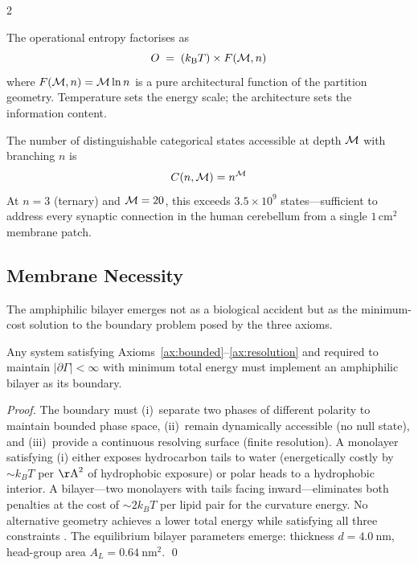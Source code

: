 \begin{multicols}{2}
\begin{corollary}
\label{cor:temperature}
The operational entropy factorises as
\begin{equation}
O \;=\; (k_{\mathrm{B}} T)\times F(\mathcal{M}, n)
\end{equation}
where $F(\mathcal{M}, n) = \mathcal{M}\ln n$ is a pure architectural function of the partition geometry. Temperature sets the energy scale; the architecture sets the information content.
\end{corollary}

\begin{corollary}
\label{cor:capacity}
The number of distinguishable categorical states accessible at depth $\mathcal{M}$ with branching $n$ is
\begin{equation}
C(n,\mathcal{M}) = n^{\mathcal{M}}
\end{equation}
At $n = 3$ (ternary) and $\mathcal{M} = 20$, this exceeds $3.5 \times 10^9$ states---sufficient to address every synaptic connection in the human cerebellum from a single $1\,\mathrm{cm}^2$ membrane patch.
\end{corollary}

\subsection{Membrane Necessity}

The amphiphilic bilayer emerges not as a biological accident but as the minimum-cost solution to the boundary problem posed by the three axioms.

\begin{theorem}
\label{thm:ch11_membrane}
Any system satisfying Axioms~\ref{ax:bounded}--\ref{ax:resolution} and required to maintain $|\partial\Gamma| < \infty$ with minimum total energy must implement an amphiphilic bilayer as its boundary.
\end{theorem}

\begin{proof}
The boundary must (i)~separate two phases of different polarity to maintain bounded phase space, (ii)~remain dynamically accessible (no null state), and (iii)~provide a continuous resolving surface (finite resolution). A monolayer satisfying (i) either exposes hydrocarbon tails to water (energetically costly by $\sim k_BT$ per $\mathrm{\AA}^2$ of hydrophobic exposure) or polar heads to a hydrophobic interior. A bilayer---two monolayers with tails facing inward---eliminates both penalties at the cost of $\sim 2k_BT$ per lipid pair for the curvature energy. No alternative geometry achieves a lower total energy while satisfying all three constraints \citep{lipowsky1995,gennis1989}. The equilibrium bilayer parameters emerge: thickness $d = 4.0\ \mathrm{nm}$, head-group area $A_L = 0.64\ \mathrm{nm}^2$. \qed
\end{proof}


\end{multicols}
